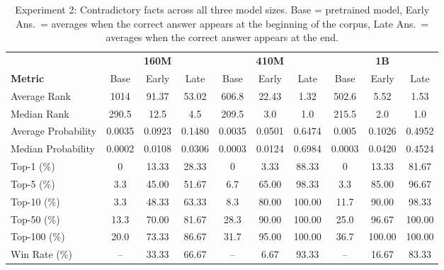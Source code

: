 \documentclass[11pt]{article}
\begin{document}
    \begin{table*}[htbp]
        \centering
        \small
        \begin{tabular}{l|ccc|ccc|ccc}
            \hline
            & \multicolumn{3}{c|}{\textbf{160M}} & \multicolumn{3}{c|}{\textbf{410M}} & \multicolumn{3}{c}{\textbf{1B}} \\
            \textbf{Metric} & Base & Early & Late & Base & Early & Late & Base & Early & Late  \\
            \hline
            Average Rank        & 1014   & 91.37  & 53.02  & 606.8    & 22.43  & 1.32  & 502.6    & 5.52   & 1.53  \\
            Median Rank         & 290.5  & 12.5   & 4.5    & 209.5    & 3.0    & 1.0   & 215.5    & 2.0    & 1.0   \\
            Average Probability & 0.0035 & 0.0923 & 0.1480 & 0.0035   & 0.0501 & 0.6474 & 0.005   & 0.1026 & 0.4952 \\
            Median Probability  & 0.0002 & 0.0108 & 0.0306 & 0.0003   & 0.0124 & 0.6984 & 0.0003  & 0.0420 & 0.4524 \\
            Top-1 (\%)          & 0      & 13.33  & 28.33  & 0        & 3.33   & 88.33  & 0       & 13.33  & 81.67  \\
            Top-5 (\%)          & 3.3    & 45.00  & 51.67  & 6.7      & 65.00  & 98.33  & 3.3     & 85.00  & 96.67  \\
            Top-10 (\%)         & 3.3    & 48.33  & 63.33  & 8.3      & 80.00  & 100.00 & 11.7    & 90.00  & 98.33  \\
            Top-50 (\%)         & 13.3   & 70.00  & 81.67  & 28.3     & 90.00  & 100.00 & 25.0    & 96.67  & 100.00 \\
            Top-100 (\%)        & 20.0   & 73.33  & 86.67  & 31.7     & 95.00  & 100.00 & 36.7    & 100.00 & 100.00 \\
            Win Rate (\%)       & --     & 33.33  & 66.67  & --       & 6.67   & 93.33  & --      & 16.67  & 83.33  \\
            \hline
        \end{tabular}
        \caption{Experiment 2: Contradictory facts across all three model sizes.
        Base = pretrained model, Early Ans.\ = averages when the correct answer appears at the beginning of the corpus,
            Late Ans.\ = averages when the correct answer appears at the end.}
        \label{tab:contradict-all}
    \end{table*}
\end{document}
